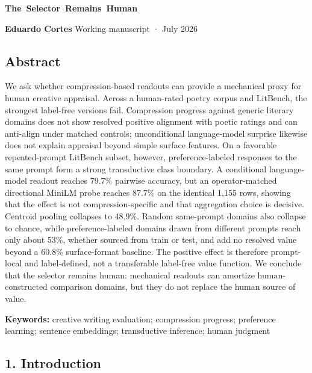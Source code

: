 \documentclass[
]{article}
\author{}
\date{}
\begin{document}
\begin{center}
{\large\bfseries\mbox{The Selector Remains Human}\par}
\vspace{0.4em}
{\normalsize\bfseries{}\par}
\end{center}

\textbf{Eduardo Cortes} Working manuscript · July 2026

\subsection{Abstract}\label{abstract}

We ask whether compression-based readouts can provide a mechanical proxy
for human creative appraisal. Across a human-rated poetry corpus and
LitBench, the strongest label-free versions fail. Compression progress
against generic literary domains does not show resolved positive
alignment with poetic ratings and can anti-align under matched controls;
unconditional language-model surprise likewise does not explain
appraisal beyond simple surface features. On a favorable repeated-prompt
LitBench subset, however, preference-labeled responses to the same
prompt form a strong transductive class boundary. A conditional
language-model readout reaches 79.7\% pairwise accuracy, but an
operator-matched directional MiniLM probe reaches 87.7\% on the
identical 1,155 rows, showing that the effect is not
compression-specific and that aggregation choice is decisive. Centroid
pooling collapses to 48.9\%. Random same-prompt domains also collapse to
chance, while preference-labeled domains drawn from different prompts
reach only about 53\%, whether sourced from train or test, and add no
resolved value beyond a 60.8\% surface-format baseline. The positive
effect is therefore prompt-local and label-defined, not a transferable
label-free value function. We conclude that the selector remains human:
mechanical readouts can amortize human-constructed comparison domains,
but they do not replace the human source of value.

\textbf{Keywords:} creative writing evaluation; compression progress;
preference learning; sentence embeddings; transductive inference; human
judgment

\subsection{1. Introduction}\label{introduction}
\end{document}
